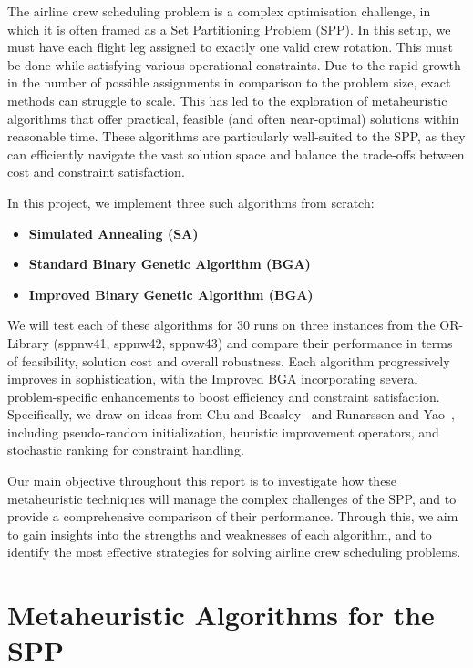 \documentclass[12pt]{article}
\begin{document}
The airline crew scheduling problem is a complex optimisation challenge, in which it is often framed as a Set Partitioning Problem (SPP).
In this setup, we must have each flight leg assigned to exactly one valid crew rotation. This must be done while satisfying various operational constraints. 
Due to the rapid growth in the number of possible assignments in comparison to the problem size, exact methods can struggle to scale.
This has led to the exploration of metaheuristic algorithms that offer practical, feasible (and often near-optimal) solutions within reasonable time.
These algorithms are particularly well-suited to the SPP, as they can efficiently navigate the vast solution space and balance the trade-offs between cost and constraint satisfaction.

In this project, we implement three such algorithms from scratch:
\begin{itemize}
    \item \textbf{Simulated Annealing (SA)}
    \item \textbf{Standard Binary Genetic Algorithm (BGA)}
    \item \textbf{Improved Binary Genetic Algorithm (BGA)}
\end{itemize}

We will test each of these algorithms for 30 runs on three instances from the OR-Library (sppnw41, sppnw42, sppnw43) and compare their performance in terms of feasibility, solution cost and overall robustness.
Each algorithm progressively improves in sophistication, with the Improved BGA incorporating several problem-specific enhancements to boost efficiency and constraint satisfaction. 
Specifically, we draw on ideas from Chu and Beasley~\cite{ChuAndBeasley1998} and Runarsson and Yao~\cite{RunarssonYao2000}, including pseudo-random initialization, heuristic improvement operators, and stochastic ranking for constraint handling.

Our main objective throughout this report is to investigate how these metaheuristic techniques will manage the complex challenges of the SPP, and to provide a comprehensive comparison of their performance.
Through this, we aim to gain insights into the strengths and weaknesses of each algorithm, and to identify the most effective strategies for solving airline crew scheduling problems.

\section{Metaheuristic Algorithms for the SPP}
\end{document}
